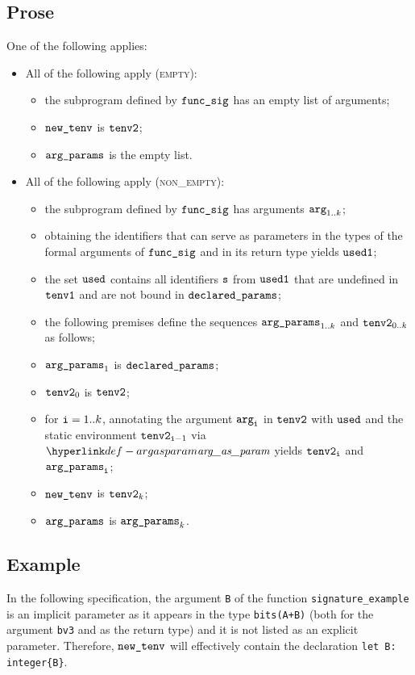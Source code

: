 \subsection{Prose}
One of the following applies:
\begin{itemize}
  \item All of the following apply (\textsc{empty}):
  \begin{itemize}
    \item the subprogram defined by $\texttt{func\_sig}$ has an empty list of arguments;
    \item $\texttt{new\_tenv}$ is $\texttt{tenv2}$;
    \item $\texttt{arg\_params}$ is the empty list.
  \end{itemize}

  \item All of the following apply (\textsc{non\_empty}):
  \begin{itemize}
    \item the subprogram defined by $\texttt{func\_sig}$ has arguments $\texttt{arg}_{1..k}$;
    \item obtaining the identifiers that can serve as parameters in the types of the formal arguments of $\texttt{func\_sig}$
          and in its return type yields $\texttt{used1}$;
    \item the set $\texttt{used}$ contains all identifiers $\texttt{s}$ from $\texttt{used1}$ that are undefined in $\texttt{tenv1}$ and are not
          bound in $\texttt{declared\_params}$;
    \item the following premises define the sequences $\texttt{arg\_params}_{1..k}$ and $\texttt{tenv2}_{0..k}$ as follows;
    \item $\texttt{arg\_params}_1$ is $\texttt{declared\_params}$;
    \item $\texttt{tenv2}_0$ is $\texttt{tenv2}$;
    \item for $\texttt{i}=1..k$, annotating the argument $\texttt{arg}_{\texttt{i}}$ in $\texttt{tenv2}$ with $\texttt{used}$ and the static environment $\texttt{tenv2}_{\texttt{i}-1}$
          via $\argasparam$ yields $\texttt{tenv2}_{\texttt{i}}$ and $\texttt{arg\_params}_{\texttt{i}}$\ProseOrTypeError;
    \item $\texttt{new\_tenv}$ is $\texttt{tenv2}_k$;
    \item $\texttt{arg\_params}$ is $\texttt{arg\_params}_k$.
  \end{itemize}
\end{itemize}

\subsection{Example}
In the following specification, the argument \texttt{B}
of the function \texttt{signature\_example} is an implicit parameter
as it appears in the type \texttt{bits(A+B)}
(both for the argument \texttt{bv3} and as the return type)
and it is not listed as an explicit parameter.
Therefore, $\texttt{new\_tenv}$ will effectively contain the declaration \verb|let B: integer{B}|.

